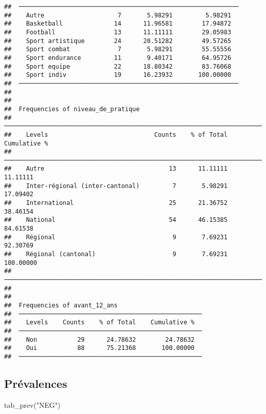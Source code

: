 \documentclass[
]{article}
\newenvironment{Shaded}{\begin{snugshade}}{\end{snugshade}}
\newcommand{\FunctionTok}[1]{\textcolor[rgb]{0.00,0.00,0.00}{#1}}
\newcommand{\NormalTok}[1]{#1}
\newcommand{\StringTok}[1]{\textcolor[rgb]{0.31,0.60,0.02}{#1}}
\begin{document}
\begin{verbatim}
##  ──────────────────────────────────────────────────────────── 
##    Autre                    7       5.98291         5.98291   
##    Basketball              14      11.96581        17.94872   
##    Football                13      11.11111        29.05983   
##    Sport artistique        24      20.51282        49.57265   
##    Sport combat             7       5.98291        55.55556   
##    Sport endurance         11       9.40171        64.95726   
##    Sport equipe            22      18.80342        83.76068   
##    Sport indiv             19      16.23932       100.00000   
##  ──────────────────────────────────────────────────────────── 
## 
## 
##  Frequencies of niveau_de_pratique                                           
##  ─────────────────────────────────────────────────────────────────────────── 
##    Levels                             Counts    % of Total    Cumulative %   
##  ─────────────────────────────────────────────────────────────────────────── 
##    Autre                                  13      11.11111        11.11111   
##    Inter-régional (inter-cantonal)         7       5.98291        17.09402   
##    International                          25      21.36752        38.46154   
##    National                               54      46.15385        84.61538   
##    Régional                                9       7.69231        92.30769   
##    Régional (cantonal)                     9       7.69231       100.00000   
##  ─────────────────────────────────────────────────────────────────────────── 
## 
## 
##  Frequencies of avant_12_ans                        
##  ────────────────────────────────────────────────── 
##    Levels    Counts    % of Total    Cumulative %   
##  ────────────────────────────────────────────────── 
##    Non           29      24.78632        24.78632   
##    Oui           88      75.21368       100.00000   
##  ──────────────────────────────────────────────────
\end{verbatim}

\hypertarget{pruxe9valences-2}{%
\subsection{Prévalences}\label{pruxe9valences-2}}

\begin{Shaded}
\begin{Highlighting}[]
\FunctionTok{tab\_prev}\NormalTok{(}\StringTok{"NEG"}\NormalTok{)}
\end{Highlighting}
\end{Shaded}
\end{document}
